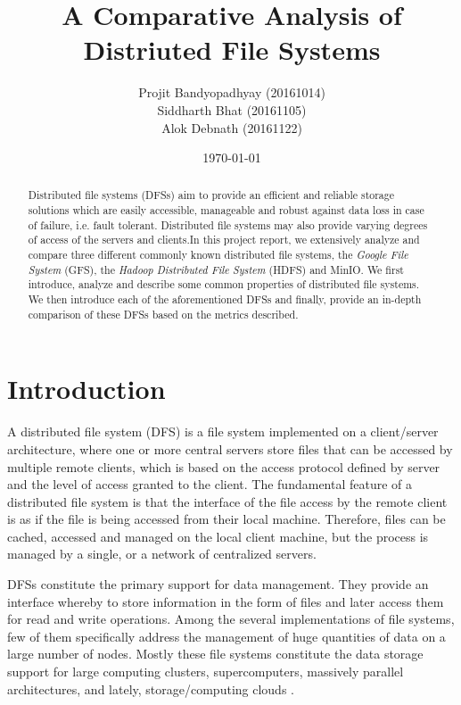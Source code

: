 \documentclass{article}
\title{A Comparative Analysis of Distriuted File Systems}
\author{Projit Bandyopadhyay (20161014) \\ Siddharth Bhat (20161105) \\ Alok Debnath (20161122)}
\date{\today}
\begin{document}
\maketitle

\begin{abstract}

Distributed file systems (DFSs) aim to provide an efficient and reliable storage solutions which are easily accessible, manageable and robust against data loss in case of failure, i.e. fault tolerant. Distributed file systems may also provide varying degrees of access of the servers and clients.In this project report, we extensively analyze and compare three different commonly known distributed file systems, the \textit{Google File System} (GFS), the \textit{Hadoop Distributed File System} (HDFS) and MinIO. We first introduce, analyze and describe some common properties of distributed file systems. We then introduce each of the aforementioned DFSs and finally, provide an in-depth comparison of these DFSs based on the metrics described. 

\end{abstract}

\section{Introduction}
\label{sec: intro}

A distributed file system (DFS) is a file system implemented on a client/server architecture, where one or more central servers store files that can be accessed by multiple remote clients, which is based on the access protocol defined by server and the level of access granted to the client. The fundamental feature of a distributed file system is that the interface of the file access by the remote client is as if the file is being accessed from their local machine. Therefore, files can be cached, accessed and managed on the local client machine, but the process is managed by a single, or a network of centralized servers.

DFSs constitute the primary support for data management. They provide an interface whereby to store information in the form of files and later access them for read and write operations. Among the several implementations of file systems, few of them specifically address the management of huge quantities of data on a large number of nodes. Mostly these file systems constitute the data storage support for large computing clusters, supercomputers, massively parallel architectures, and lately, storage/computing clouds \cite{buyya2013mastering}.
\end{document}
